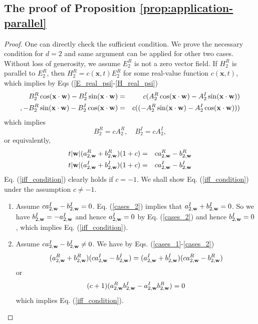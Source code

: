 \documentclass[10pt,reqno]{amsart}
\renewcommand{\(}{\left(}
\renewcommand{\)}{\right)}
\newcommand{\bw}{{\bf w}}
\newcommand{\bx}{\mathbf{x}}
\numberwithin{equation}{section}
\begin{document}
\subsection{The proof of Proposition  \ref{prop:application-parallel}} \label{app-prop-application-parallel}
\begin{proof}
	One can directly check the sufficient condition.  We prove the necessary condition for $d=2$ and same argument can be applied for other two cases. Without loss of generosity, we assume $E^R_{2}$ is not a zero vector field.  If $H^R_{2}$ is parallel to $E^R_{2}$, then $H^R_{2} =c(\bx,t) E^R_{2}$ for some real-value function $c (\bx, t)$, which implies by Eqs (\ref{E_real_psi}-\ref{H_real_psi})
	\begin{eqnarray*}
		B^R_{2} \cos(\bx\cdot \bw)  - B^I_{2} \sin(\bx\cdot \bw) &=& c (A^R_{2} \cos(\bx\cdot \bw)  - A^I_{2} \sin(\bx\cdot \bw))\\,
		-B^R_{2} \sin(\bx\cdot \bw)  - B^I_{2} \cos(\bx\cdot \bw) &=& c( (-A^R_{2} \sin(\bx\cdot \bw)  - A^I_{2} \cos(\bx\cdot \bw)) )
	\end{eqnarray*}
	which implies
	\[
	B^R_{2} = c A^R_{2}, \quad B^I_{2} = c A^I_{2},
	\]
	or equivalently,
	\begin{eqnarray}
		t|\bw|(a^R_{2,\bw} + b^R_{2,\bw}) (1+c) &=& c a^R_{2,\bw} -b^R_{2,\bw} \label{cases_1} \\
		t|\bw|(a^I_{2,\bw} + b^I_{2,\bw}) (1+c) &=& c a^I_{2,\bw}  - b^I_{2,\bw}  \label{cases_2} 
	\end{eqnarray}
	Eq. (\ref{iff_condition}) clearly holds if $c=-1$. We shall show Eq. (\ref{iff_condition}) under the assumption $c\neq -1$.
	\begin{enumerate}
		\item Assume $c a^I_{2,\bw} -b^I_{2,\bw} =0$.  Eq. (\ref{cases_2}) implies that $a^I_{2,\bw} + b^I_{2,\bw}=0$.  So we have $b^I_{2,\bw} = -a^I_{2,\bw}$ and hence $a^I_{2,\bw}=0$ by Eq. (\ref{cases_2}) and hence $b^I_{2,\bw}=0 $, which implies Eq. (\ref{iff_condition}).
		\item  Assume $c a^I_{2,\bw} -b^I_{2,\bw} \neq 0$.  We have by Eqs. (\ref{cases_1}-\ref{cases_2})
		\[
		(a^R_{2,\bw} + b^R_{2,\bw}) (c a^I_{2,\bw}  - b^I_{2,\bw}) = (a^I_{2,\bw} + b^I_{2,\bw})(c a^R_{2,\bw} -b^R_{2,\bw})
		\]
		or
		\[
		(c+1)(a^R_{2,\bw} b^I_{2,\bw} - a^I_{2,\bw} b^R_{2,\bw})=0
		\]
		which implies Eq. (\ref{iff_condition}).
	\end{enumerate}
\end{proof}
\end{document}

